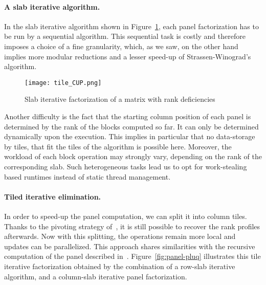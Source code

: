 \documentclass{article}
\begin{document}
 
 

 
 
\vspace{-1em}
\paragraph{A slab iterative algorithm.}
 
 
 
 
 
 
In the slab iterative algorithm shown in Figure~\ref{fig:TileCUP}, each panel factorization has to be run by a
sequential algorithm. This sequential task is costly and therefore imposes a
choice of a fine granularity, which, as we saw, on the other hand implies more
modular reductions and a lesser speed-up of Strassen-Winograd's algorithm.
\begin{figure}[ht!]
\centering
\texttt{[image: tile\_CUP.png]}
 
 
\caption{Slab iterative factorization of a matrix with rank deficiencies}
\label{fig:TileCUP}
\end{figure}

Another difficulty is the fact that the starting column position of
each panel is determined by the rank of the blocks computed so far.
It can only be determined dynamically upon the execution.
This implies in particular that no data-storage by tiles, that fit the
tiles of the algorithm is possible here. 
Moreover, the workload of each block operation may strongly vary,
depending on the rank of the corresponding slab. Such heterogeneous
tasks lead us to opt for work-stealing based runtimes instead of
static thread management. 
 
 

 
 
 
 
 
 
 



 
 
 
 
 
 
 
 

 
 
\vspace{-1em}
\paragraph{Tiled iterative elimination.}
In order to speed-up the panel computation, we can split it into column
tiles. Thanks to the pivoting strategy of~\cite{DPS13}, it is still possible to
recover the rank profiles afterwards. Now with this splitting, the operations
remain more local and updates can be parallelized.
This approach shares similarities with the recursive computation of the panel
described in~\cite{DFLL11}.
Figure~\ref{fig:panel-pluq} illustrates this tile iterative factorization
obtained by the combination of a row-slab iterative algorithm, and a column-slab
iterative panel factorization.
 
\end{document}
